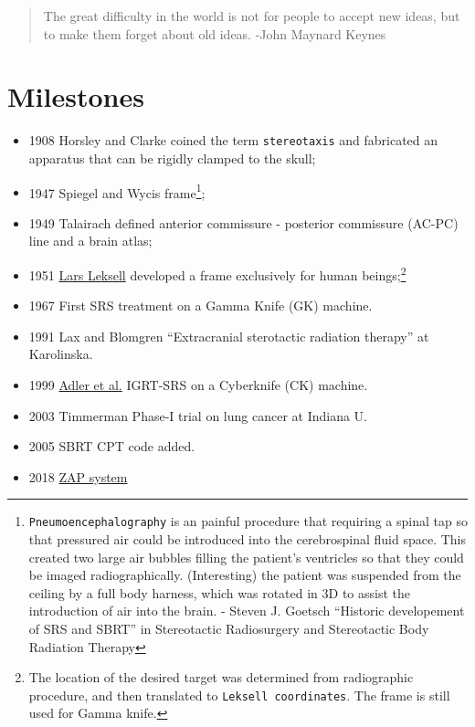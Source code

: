 \documentclass[]{book}
\providecommand{\tightlist}{%
  \setlength{\itemsep}{0pt}\setlength{\parskip}{0pt}}
\let\rmarkdownfootnote\footnote%
\def\footnote{\protect\rmarkdownfootnote}
\theoremstyle{definition}
\theoremstyle{definition}
\theoremstyle{definition}
\theoremstyle{remark}
\begin{document}
\begin{quote}
The great difficulty in the world is not for people to accept new ideas,
but to make them forget about old ideas. -John Maynard Keynes
\end{quote}

\section{Milestones}\label{milestones}

\begin{itemize}
\tightlist
\item
  1908 Horsley and Clarke coined the term \texttt{stereotaxis} and
  fabricated an apparatus that can be rigidly clamped to the skull;
\item
  1947 Spiegel and Wycis frame\footnote{\texttt{Pneumoencephalography}
    is an painful procedure that requiring a spinal tap so that
    pressured air could be introduced into the cerebrospinal fluid
    space. This created two large air bubbles filling the patient's
    ventricles so that they could be imaged radiographically.
    (Interesting) the patient was suspended from the ceiling by a full
    body harness, which was rotated in 3D to assist the introduction of
    air into the brain. - Steven J. Goetsch ``Historic developement of
    SRS and SBRT'' in Stereotactic Radiosurgery and Stereotactic Body
    Radiation Therapy};
\item
  1949 Talairach defined anterior commissure - posterior commissure
  (AC-PC) line and a brain atlas;
\item
  1951 \href{https://en.wikipedia.org/wiki/Lars_Leksell}{Lars Leksell}
  developed a frame exclusively for human beings;\footnote{The location
    of the desired target was determined from radiographic procedure,
    and then translated to \texttt{Leksell\ coordinates}. The frame is
    still used for Gamma knife.}
\item
  1967 First SRS treatment on a Gamma Knife (GK) machine.
\item
  1991 Lax and Blomgren ``Extracranial sterotactic radiation therapy''
  at Karolinska.
\item
  1999 \href{https://www.ncbi.nlm.nih.gov/pubmed/10371630}{Adler et al.}
  IGRT-SRS on a Cyberknife (CK) machine.
\item
  2003 Timmerman Phase-I trial on lung cancer at Indiana U.
\item
  2005 SBRT CPT code added.
\item
  2018
  \href{https://www.cureus.com/articles/9924-self-shielding-analysis-of-the-zap-x-system}{ZAP
  system}
\end{itemize}
\end{document}
